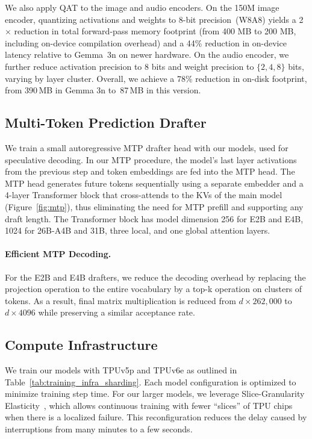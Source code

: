 \documentclass[11pt, a4paper, logo, twocolumn, copyright]{googledeepmind}
\begin{document}
\noindent{}We also apply QAT to the image and audio encoders. On the 150M image encoder, quantizing activations and weights to 8-bit precision~(W8A8) yields a 2$\times$ reduction in total forward-pass memory footprint (from 400 MB to 200 MB, including on-device compilation overhead) and a 44\% reduction in on-device latency relative to Gemma~3n on newer hardware.
On the audio encoder, we further reduce activation precision to 8 bits and weight precision to $\{2, 4, 8\}$ bits, varying by layer cluster. Overall, we achieve a 78\% reduction in on-disk footprint, from 390\,MB in Gemma 3n to~87\,MB in this version.

\subsection{Multi-Token Prediction Drafter}

We train a small autoregressive MTP drafter head with our models, used for speculative decoding. In our MTP procedure, the model's last layer activations from the previous step and token embeddings are fed into the MTP head. The MTP head generates future tokens sequentially using a separate embedder and a 4-layer Transformer block that cross-attends to the KVs of the main model (Figure~\ref{fig:mtp}), thus eliminating the need for MTP prefill and supporting any draft length. The Transformer block has model dimension 256 for E2B and E4B, 1024 for 26B-A4B and 31B, three local, and one global attention layers.


\paragraph{Efficient MTP Decoding.}
For the E2B and E4B drafters, we reduce the decoding overhead by replacing the projection operation to the entire vocabulary by a top-k operation on clusters of tokens. As a result, final matrix multiplication is reduced from $d\times 262,000$ to $d\times 4096$ while preserving a similar acceptance rate.


\subsection{Compute Infrastructure}

We train our models with TPUv5p and TPUv6e as outlined in Table~\ref{tab:training_infra_sharding}.
Each model configuration is optimized to minimize training step time. 
For our larger models, we leverage Slice-Granularity Elasticity~\citep{comanici2025gemini}, which allows continuous training with fewer “slices” of TPU chips when there is a localized failure. This reconfiguration reduces the delay caused by interruptions from many minutes to a few seconds.
\end{document}
